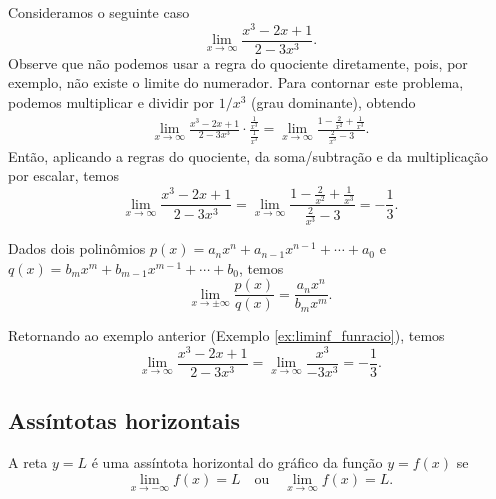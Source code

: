 \begin{ex}\label{ex:liminf_funracio}
  Consideramos o seguinte caso
  \begin{equation}
    \lim_{x\to \infty} \frac{x^3 - 2x + 1}{2 - 3x^3}.
  \end{equation}
  Observe que não podemos usar a regra do quociente diretamente, pois, por exemplo, não existe o limite do numerador. Para contornar este problema, podemos multiplicar e dividir por $1/x^3$ (grau dominante), obtendo
  \begin{align}
    \lim_{x\to\infty} \frac{x^3 - 2x + 1}{2 - 3x^3}\cdot\frac{\frac{1}{x^3}}{\frac{1}{x^3}} = \lim_{x\to\infty} \frac{1-\frac{2}{x^2} + \frac{1}{x^3}}{\frac{2}{x^3}-3}. 
  \end{align}
  Então, aplicando a regras do quociente, da soma/subtração e da multiplicação por escalar, temos
  \begin{equation}
    \lim_{x\to\infty} \frac{x^3 - 2x + 1}{2 - 3x^3} = \lim_{x\to\infty} \frac{1-\frac{2}{x^2} + \frac{1}{x^3}}{\frac{2}{x^3}-3} = -\frac{1}{3}.
  \end{equation}
\end{ex}

\begin{obs}
  Dados dois polinômios $p(x) = a_nx^n+a_{n-1}x^{n-1}+\cdots + a_0$ e $q(x) = b_mx^m+b_{m-1}x^{m-1}+\cdots + b_0$, temos
  \begin{equation}
    \lim_{x\to \pm\infty} \frac{p(x)}{q(x)} = \frac{a_nx^n}{b_mx^m}.
  \end{equation}
\end{obs}

\begin{ex}
  Retornando ao exemplo anterior (Exemplo \ref{ex:liminf_funracio}), temos
  \begin{equation}
    \lim_{x\to\infty} \frac{x^3 - 2x + 1}{2 - 3x^3} = \lim_{x\to\infty} \frac{x^3}{-3x^3} = -\frac{1}{3}.
  \end{equation}
\end{ex}

\subsection{Assíntotas horizontais}

A reta $y = L$ é uma assíntota horizontal do gráfico da função $y = f(x)$ se
\begin{equation}
  \lim_{x\to -\infty} f(x) = L\quad\text{ou}\quad\lim_{x\to\infty} f(x) = L.
\end{equation}

